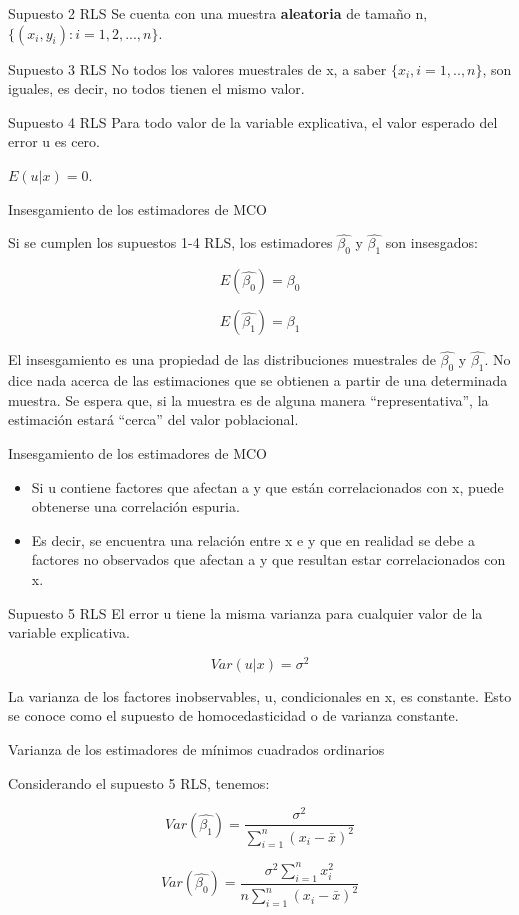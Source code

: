 \documentclass{beamer}
\begin{document}
\begin{frame}{Supuesto 2 RLS}
    Se cuenta con una muestra {\bf aleatoria} de tamaño n, $\lbrace(x_i,y_i): i = 1, 2, ..., n\rbrace$.


\end{frame}

\begin{frame}{Supuesto 3 RLS}
    No todos los valores muestrales de x, a saber $\lbrace x_i, i = 1,.., n\rbrace$, son iguales, es decir, no todos tienen
el mismo valor.
\end{frame}

\begin{frame}{Supuesto 4 RLS}
    Para todo valor de la variable explicativa, el valor esperado del error u es cero. 
    
$E(u|x) = 0$.
\end{frame}


\begin{frame}{Insesgamiento de los estimadores de MCO}


    Si se cumplen los supuestos 1-4 RLS, los estimadores $\hat{\beta_0}$ y $\hat{\beta_1}$ son insesgados:


$$E(\hat{\beta_0})=\beta_0$$

$$E(\hat{\beta_1})=\beta_1$$

El insesgamiento es una propiedad de las distribuciones muestrales de $\hat{\beta_0}$ y $\hat{\beta_1}$.
No dice nada acerca de las estimaciones que se obtienen a partir de una determinada
muestra. Se espera que, si la muestra es de alguna manera “representativa”, la estimación estará “cerca” del valor poblacional.
     
\end{frame}


\begin{frame}{Insesgamiento de los estimadores de MCO}
    
    \begin{itemize}
        \item Si u contiene factores que afectan a y  que están
correlacionados con x, puede obtenerse una {\color{blue} correlación espuria}.
\item Es decir, se encuentra
una relación entre  x e y que en realidad se debe a factores no observados que afectan a y  que
resultan estar correlacionados con x.
    \end{itemize}


\end{frame}


\begin{frame}{Supuesto 5 RLS}
    El error u tiene la misma varianza para cualquier valor de la variable explicativa. 
    
$$Var(u|x)=\sigma^2$$

La varianza de los
factores inobservables, u, condicionales en x, es constante. Esto se conoce como el supuesto de {\color{blue}
homocedasticidad o de varianza constante.}
\end{frame}

\begin{frame}{Varianza de los estimadores de mínimos cuadrados ordinarios}

Considerando el supuesto 5 RLS, tenemos:

$$Var(\hat{\beta_1})=\frac{\sigma^2}{\sum_{i=1}^n(x_i-\bar{x})^2} $$

$$Var(\hat{\beta_0})=\frac{\sigma^2 \sum_{i=1}^nx_i^2}{n\sum_{i=1}^n(x_i-\bar{x})^2 }$$

    
\end{frame}
\end{document}
